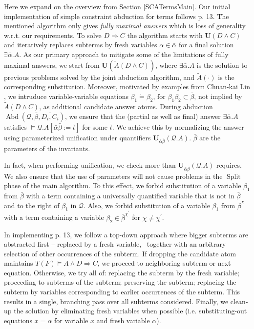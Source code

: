 \documentclass{article}
\newcommand{\assign}{:=}
\newcommand{\cdummy}{\cdot}
\newcommand{\tmem}[1]{{\em #1\/}}
\newcommand{\tmmathbf}[1]{\ensuremath{\boldsymbol{#1}}}
\newcommand{\tmop}[1]{\ensuremath{\operatorname{#1}}}
\begin{document}
Here we expand on the overview from Section \ref{SCATermsMain}. Our initial
implementation of simple constraint abduction for terms follows
{\cite{AbductionSolvMaher}} p. 13. The mentioned algorithm only gives
{\tmem{fully maximal answers}} which is loss of generality w.r.t. our
requirements. To solve $D \Rightarrow C$ the algorithm starts with
$\tmmathbf{U} (D \wedge C)$ and iteratively replaces subterms by fresh
variables $\alpha \in \bar{\alpha}$ for a final solution $\exists \bar{\alpha}
.A$. As our primary approach to mitigate some of the limitations of fully
maximal answers, we start from $\tmmathbf{U}_{} (\tilde{A} (D \wedge C))$,
where $\exists \bar{\alpha} .A$ is the solution to previous problems solved by
the joint abduction algorithm, and $\tilde{A} (\cdummy)$ is the corresponding
substitution. Moreover, motivated by examples from Chuan-kai Lin
{\cite{PracticalGADTsInfer}}, we intruduce variable-variable equations
$\beta_1 \dot{=} \beta_2$, for $\beta_1 \beta_2 \subset \bar{\beta}$, not
implied by $\tilde{A} (D \wedge C)$, as additional candidate answer atoms.
During abduction $\tmop{Abd} (\mathcal{Q}, \bar{\beta}, \overline{D_i, C_i})$,
we ensure that the (partial as well as final) answer $\exists \bar{\alpha} .A$
satisfies $\vDash \mathcal{Q}.A [\bar{\alpha} \bar{\beta} \assign \bar{t}]$
for some $\bar{t}$. We achieve this by normalizing the answer using
parameterized unification under quantifiers $\tmmathbf{U}_{\bar{\alpha}
\bar{\beta}} (\mathcal{Q}.A)$. $\bar{\beta}$ are the parameters of the
invariants.

In fact, when performing unification, we check more than
$\tmmathbf{U}_{\bar{\alpha} \bar{\beta}} (\mathcal{Q}.A)$ requires. We also
ensure that the use of parameters will not cause problems in the
$\tmop{Split}$ phase of the main algorithm. To this effect, we forbid
substitution of a variable $\beta_1$ from $\bar{\beta}$ with a term containing
a universally quantified variable that is not in $\bar{\beta}$ and to the
right of $\beta_1$ in $\mathcal{Q}$. Also, we forbid substitution of a
variable $\beta_1$ from $\bar{\beta}^{\chi}$ with a term containing a variable
$\beta_2 \in \bar{\beta}^{\chi^{\prime}}$ for $\chi \neq \chi^{\prime}$.

In implementing {\cite{AbductionSolvMaher}} p. 13, we follow a top-down
approach where bigger subterms are abstracted first -- replaced by a fresh
variable, \ together with an arbitrary selection of other occurrences of the
subterm. If dropping the candidate atom maintains $T (F) \vDash A \wedge D
\Rightarrow C$, we proceed to neighboring subterm or next equation. Otherwise,
we try all of: replacing the subterm by the fresh variable; proceeding to
subterms of the subterm; preserving the subterm; replacing the subterm by
variables corresponding to earlier occurrences of the subterm. This results in
a single, branching pass over all subterms considered. Finally, we clean-up
the solution by eliminating fresh variables when possible (i.e.
substituting-out equations $x \dot{=} \alpha$ for variable $x$ and fresh
variable $\alpha$).
\end{document}
